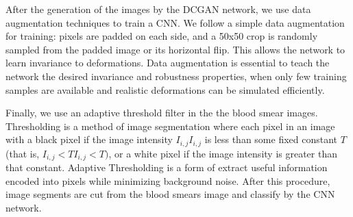 %

%

After the generation of the images by the DCGAN network, we use data augmentation techniques to train a CNN. We follow a simple data augmentation for training: pixels are padded on each side, and a 50x50 crop is randomly sampled from the padded image or its horizontal flip. This allows the network to learn invariance to deformations. Data augmentation is essential to teach the network the desired invariance and robustness properties, when only few training samples are available and realistic deformations can be simulated efficiently.

Finally, we use an adaptive threshold filter in the the blood smear images.  Thresholding is a method of image segmentation where each pixel in an image with a black pixel if the image intensity ${\displaystyle I_{i,j}} I_{{i,j}}$ is less than some fixed constant $T$ (that is, ${\displaystyle I_{i,j}<T} I_{{i,j}}<T)$, or a white pixel if the image intensity is greater than that constant. Adaptive Thresholding is a form of extract useful information encoded into pixels while minimizing background noise. After this procedure, image segments are cut from the blood smears image and classify by the CNN network.